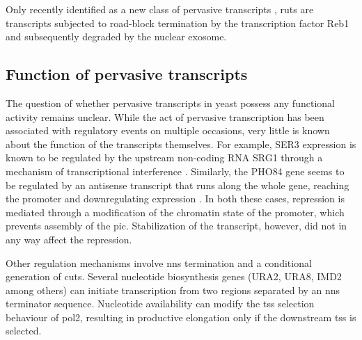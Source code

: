 Only recently identified as a new class of pervasive transcripts \cite{colin:2014:roadblock}, \gls{ruts} are transcripts subjected to road-block termination by the transcription factor Reb1 and subsequently degraded by the nuclear exosome.

\subsection{Function of pervasive transcripts}

The question of whether pervasive transcripts in yeast possess any functional activity remains unclear.
While the act of pervasive transcription has been associated with regulatory events on multiple occasions, very little is known about the function of the transcripts themselves.
For example, SER3 expression is known to be  regulated by the upstream non-coding RNA SRG1 through a mechanism of transcriptional interference \cite{martens:2004:intergenic}.  
Similarly, the PHO84 gene seems to be regulated by an antisense transcript that runs along the whole gene, reaching the promoter and downregulating expression \cite{castelnuovo:2013:bimodal}.
In both these cases, repression is mediated through a modification of the chromatin state of the promoter, which prevents assembly of the \acrlong{pic}.
Stabilization of the transcript, however, did not in any way affect the repression.

Other regulation mechanisms involve \gls{nns} termination and a conditional generation of cuts.
Several nucleotide biosynthesis genes (URA2, URA8, IMD2 among others) can initiate transcription from two regions separated by an \gls{nns} terminator sequence.
Nucleotide availability can modify the \gls{tss} selection behaviour of \gls{pol2}, resulting in productive elongation only if the downstream \gls{tss} is selected.



\clearpage



